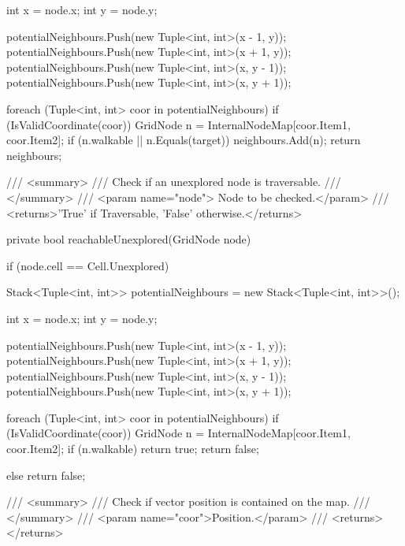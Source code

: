\documentclass[11pt]{article}
\begin{document}
\begin{code}
{{{            int x = node.x;
            int y = node.y;

            potentialNeighbours.Push(new Tuple<int, int>(x - 1, y));
            potentialNeighbours.Push(new Tuple<int, int>(x + 1, y));
            potentialNeighbours.Push(new Tuple<int, int>(x, y - 1));
            potentialNeighbours.Push(new Tuple<int, int>(x, y + 1));

            foreach (Tuple<int, int> coor in potentialNeighbours)
            {
                if (IsValidCoordinate(coor))
                {
                    GridNode n = InternalNodeMap[coor.Item1, coor.Item2];
                    if (n.walkable || n.Equals(target))
                    {
                        neighbours.Add(n);
                    }
                }
            }
            return neighbours;
        }
        /// <summary>
        /// Check if an unexplored node is traversable.
        /// </summary>
        /// <param name="node"> Node to be checked.</param>
        /// <returns>'True' if Traversable, 'False' otherwise.</returns>

        private bool reachableUnexplored(GridNode node)
        {
            if (node.cell == Cell.Unexplored)
            {
                Stack<Tuple<int, int>> potentialNeighbours
                   = new Stack<Tuple<int, int>>();

                int x = node.x;
                int y = node.y;

                potentialNeighbours.Push(new Tuple<int, int>(x - 1, y));
                potentialNeighbours.Push(new Tuple<int, int>(x + 1, y));
                potentialNeighbours.Push(new Tuple<int, int>(x, y - 1));
                potentialNeighbours.Push(new Tuple<int, int>(x, y + 1));

                foreach (Tuple<int, int> coor in potentialNeighbours)
                {
                    if (IsValidCoordinate(coor))
                    {
                        GridNode n = InternalNodeMap[coor.Item1, coor.Item2];
                        if (n.walkable)
                        {
                            return true;
                        }
                    }
                }
                return false;
            }
            else
            {
                return false;
            }
        }

        /// <summary>
        /// Check if vector position is contained on the map.
        /// </summary>
        /// <param name="coor">Position.</param>
        /// <returns></returns>

}}
\end{code}
\end{document}
